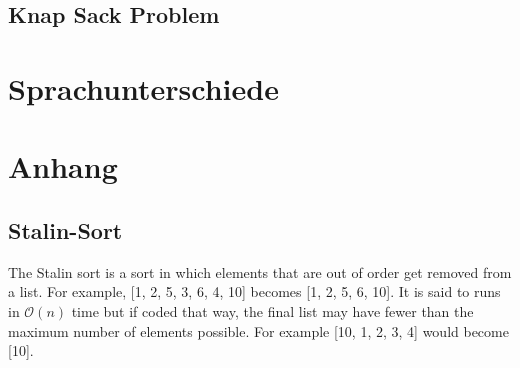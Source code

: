 \documentclass[a4paper]{article}
\begin{document}
\subsection{Knap Sack Problem}





\section{Sprachunterschiede}


\newpage
\section{Anhang}
\subsection{Stalin-Sort}
The Stalin sort is a sort in which elements that are out of order get removed from a list. For example, [1, 2, 5, 3, 6, 4, 10] becomes [1, 2, 5, 6, 10]. It is said to runs in $\mathcal{O}(n)$ time but if coded that way, the final list may have fewer than the maximum number of elements possible. For example [10, 1, 2, 3, 4] would become [10].
\end{document}
